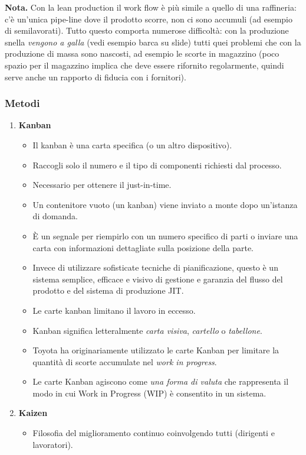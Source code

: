\documentclass[a4paper,portrait,12pt]{article}
\theoremstyle{definition}
\begin{document}
\textbf{Nota.} Con la lean production il work flow è più simile a quello di una raffineria: c'è un'unica pipe-line dove il prodotto scorre, non ci sono accumuli (ad esempio di semilavorati).
Tutto questo comporta numerose difficoltà: con la produzione snella \emph{vengono a galla} (vedi esempio barca su slide) tutti quei problemi che con la produzione di massa sono nascosti, ad esempio le scorte in magazzino (poco spazio per il magazzino implica che deve essere rifornito regolarmente, quindi serve anche un rapporto di fiducia con i fornitori).

\subsubsection{Metodi}

\begin{enumerate}
\item \textbf{Kanban}

	\begin{itemize}	
	\item Il kanban è una carta specifica (o un altro dispositivo).
	\item Raccogli solo il numero e il tipo di componenti richiesti dal processo.
	\item Necessario per ottenere il just-in-time.
	\item Un contenitore vuoto (un kanban) viene inviato a monte dopo un'istanza di domanda.
	\item È un segnale per riempirlo con un numero specifico di parti o inviare una carta con informazioni dettagliate sulla posizione della parte.
	\item Invece di utilizzare sofisticate tecniche di pianificazione, questo è un sistema semplice, efficace e visivo di gestione e garanzia del flusso del prodotto e del sistema di produzione JIT.
	\item Le carte kanban limitano il lavoro in eccesso.
	\item Kanban significa letteralmente \emph{carta visiva}, \emph{cartello} o \emph{tabellone}.
	\item Toyota ha originariamente utilizzato le carte Kanban per limitare la quantità di scorte accumulate nel \emph{work in progress}. 
	\item Le carte Kanban agiscono come \emph{una forma di valuta} che rappresenta il modo in cui Work in Progress (WIP) è consentito in un sistema.
	\end{itemize}
	
\item \textbf{Kaizen}
	\begin{itemize}
	\item Filosofia del miglioramento continuo coinvolgendo tutti (dirigenti e lavoratori).
	\end{itemize}


\end{enumerate}
\end{document}

